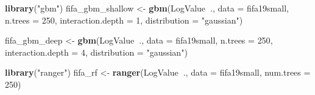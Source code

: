 \documentclass[]{krantz}
\newenvironment{Shaded}{\begin{snugshade}}{\end{snugshade}}
\newcommand{\DataTypeTok}[1]{\textcolor[rgb]{0.13,0.29,0.53}{#1}}
\newcommand{\DecValTok}[1]{\textcolor[rgb]{0.00,0.00,0.81}{#1}}
\newcommand{\KeywordTok}[1]{\textcolor[rgb]{0.13,0.29,0.53}{\textbf{#1}}}
\newcommand{\NormalTok}[1]{#1}
\newcommand{\OperatorTok}[1]{\textcolor[rgb]{0.81,0.36,0.00}{\textbf{#1}}}
\newcommand{\StringTok}[1]{\textcolor[rgb]{0.31,0.60,0.02}{#1}}
\begin{document}
\begin{Shaded}
\begin{Highlighting}[]
\KeywordTok{library}\NormalTok{(}\StringTok{"gbm"}\NormalTok{)}
\NormalTok{fifa_gbm_shallow <-}\StringTok{ }\KeywordTok{gbm}\NormalTok{(LogValue}\OperatorTok{~}\NormalTok{., }\DataTypeTok{data =}\NormalTok{ fifa19small, }\DataTypeTok{n.trees =} \DecValTok{250}\NormalTok{,}
        \DataTypeTok{interaction.depth =} \DecValTok{1}\NormalTok{, }\DataTypeTok{distribution =} \StringTok{"gaussian"}\NormalTok{)}

\NormalTok{fifa_gbm_deep <-}\StringTok{ }\KeywordTok{gbm}\NormalTok{(LogValue}\OperatorTok{~}\NormalTok{., }\DataTypeTok{data =}\NormalTok{ fifa19small, }\DataTypeTok{n.trees =} \DecValTok{250}\NormalTok{,}
        \DataTypeTok{interaction.depth =} \DecValTok{4}\NormalTok{, }\DataTypeTok{distribution =} \StringTok{"gaussian"}\NormalTok{)}

\KeywordTok{library}\NormalTok{(}\StringTok{"ranger"}\NormalTok{)}
\NormalTok{fifa_rf <-}\StringTok{ }\KeywordTok{ranger}\NormalTok{(LogValue}\OperatorTok{~}\NormalTok{., }\DataTypeTok{data =}\NormalTok{ fifa19small, }\DataTypeTok{num.trees =} \DecValTok{250}\NormalTok{)}


\end{Highlighting}
\end{Shaded}
\end{document}
